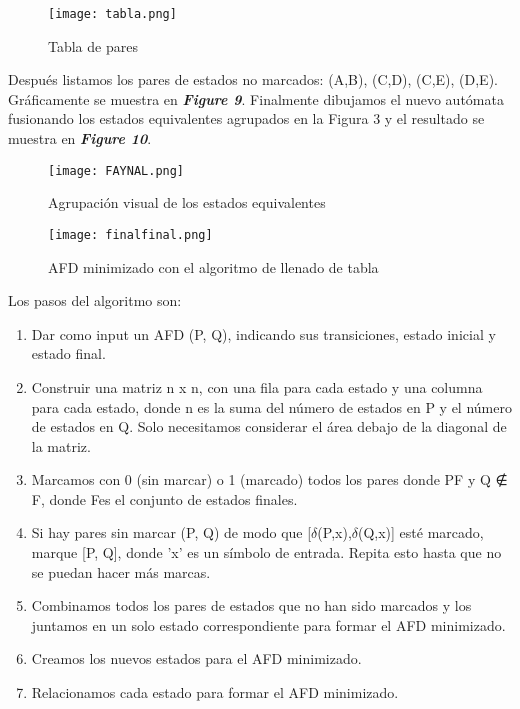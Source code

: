 \documentclass[12pt]{article}
\begin{document}
\begin{figure}[h]
    \centering
    \texttt{[image: tabla.png]}
    \caption{Tabla de pares}
    \label{fig:my_label}
\end{figure}

Después listamos los pares de estados no marcados: {(A,B), (C,D), (C,E), (D,E)}. Gráficamente se muestra en \textbf{\textit{Figure 9}}. Finalmente dibujamos el nuevo autómata fusionando los estados equivalentes agrupados en la Figura 3 y el resultado se muestra en \textbf{\textit{Figure 10}}.

\begin{figure}[h]
    \centering
    \texttt{[image: FAYNAL.png]}
    \caption{Agrupación visual de los estados equivalentes}
    \label{fig:my_label}
\end{figure}



\begin{figure}[h]
    \centering
    \texttt{[image: finalfinal.png]}
    \caption{AFD minimizado con el algoritmo de llenado de tabla}
    \label{fig:my_label}
\end{figure}

\newpage

Los pasos del algoritmo son:

\begin{enumerate}
\item Dar como input un AFD (P, Q), indicando sus transiciones, estado inicial y estado final.
\item Construir una matriz n x n, con una fila para cada estado y una columna para cada estado, donde n es la suma del número de estados en P y el número de estados en Q. Solo necesitamos considerar el área debajo de la diagonal de la matriz.
\item Marcamos con 0 (sin marcar) o 1 (marcado) todos los pares donde PF y Q ∉ F, donde Fes el conjunto de estados finales.
\item Si hay pares sin marcar (P, Q) de modo que [$\delta$(P,x),$\delta$(Q,x)] esté marcado, marque [P, Q], donde 'x' es un símbolo de entrada. Repita esto hasta que no se puedan hacer más marcas.
\item Combinamos todos los pares de estados que no han sido marcados y los juntamos en un solo estado correspondiente para formar el AFD minimizado.
\item Creamos los nuevos estados para el AFD minimizado.
\item Relacionamos cada estado para formar el AFD minimizado.
\end{enumerate}
\end{document}
